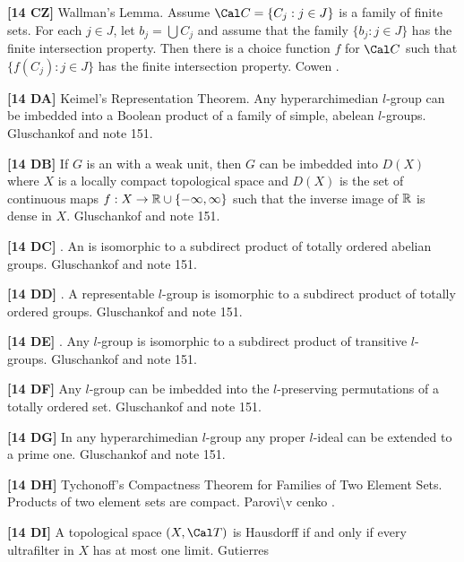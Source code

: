 \smallskip
\item{}{\bf [14 CZ]} Wallman's Lemma.  Assume $\Cal C =
\{ C_j : j\in J\}$ is a family of finite sets.  For each $j\in J$,
let $b_j =\bigcup C_j$ and assume that the family $\{ b_j : j\in J\}$
has the finite intersection property.  Then there is a choice
function  $f$ for $\Cal C$ such that $\{ f(C_j) : j\in J\}$ has
the finite intersection property.  \ac{Cowen} \cite{1983}.
\smallskip
\item{}{\bf [14 DA]} Keimel's Representation Theorem. Any hyperarchimedian
$l$-group can be imbedded into a Boolean product of a family of simple,
abelean $l$-groups. \ac{Gluschankof} \cite{1995} and note 151.
\smallskip
\item{}{\bf [14 DB]} If $G$ is an  with a weak
unit, then $G$ can be imbedded into $D(X)$ where $X$ is a locally compact
topological space and $D(X)$ is the set of continuous maps
$f: X\to \Bbb R \cup \{-\infty, \infty\}$ such that the inverse image
of $\Bbb R$ is dense in $X$.  \ac{Gluschankof} \cite{1995} and note 151.
\smallskip
\item{}{\bf [14 DC]} . An 
is isomorphic to a subdirect product of totally ordered abelian groups.
\ac{Gluschankof} \cite{1995} and note 151.
\smallskip
\item{}{\bf [14 DD]} . A representable $l$-group is
isomorphic to a subdirect product of totally ordered groups.
\ac{Gluschankof} \cite{1995} and note 151.
\smallskip
\item{}{\bf [14 DE]} . Any $l$-group is isomorphic
to a subdirect product of transitive $l$-groups. \ac{Gluschankof} \cite{1995}
and note 151.
\smallskip
\item{}{\bf [14 DF]} Any $l$-group can be imbedded into the $l$-preserving
permutations of a totally ordered set. \ac{Gluschankof} \cite{1995} and
note 151.
\smallskip
\item{}{\bf [14 DG]} In any hyperarchimedian $l$-group any proper
$l$-ideal can be extended to a prime one. \ac{Gluschankof}
\cite{1989} and note 151.
\smallskip
\item{}{\bf [14 DH]} Tychonoff's Compactness Theorem for Families of
Two Element Sets. Products of two element sets are compact.
\ac{Parovi\v cenko} \cite{1969}.
\smallskip
\item{}{\bf [14 DI]} A topological space $(X,\Cal T)$ is Hausdorff if and
only if every ultrafilter in $X$ has at most one limit.  \ac{Gutierres}
